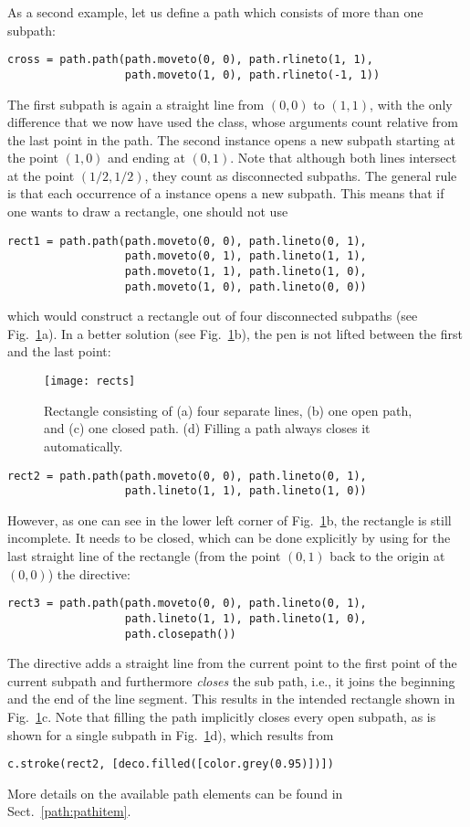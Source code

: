 As a second example, let us define a path which consists of more than 
one subpath:
\begin{verbatim}
cross = path.path(path.moveto(0, 0), path.rlineto(1, 1),
                  path.moveto(1, 0), path.rlineto(-1, 1))
\end{verbatim}
The first subpath is again a straight line from $(0, 0)$ to $(1, 1)$,
with the only difference that we now have used the 
class, whose arguments count relative from the last point in the path.
The second  instance opens a new subpath starting at the
point $(1, 0)$ and ending at $(0, 1)$. Note that although both lines
intersect at the point $(1/2, 1/2)$, they count as disconnected
subpaths.  The general rule is that each occurrence of a 
instance opens a new subpath. This means that if one wants to draw a
rectangle, one should not use
\begin{verbatim}
rect1 = path.path(path.moveto(0, 0), path.lineto(0, 1),
                  path.moveto(0, 1), path.lineto(1, 1),
                  path.moveto(1, 1), path.lineto(1, 0),
                  path.moveto(1, 0), path.lineto(0, 0))
\end{verbatim}
which would construct a rectangle out of four disconnected
subpaths (see Fig.~\ref{fig:rects}a). In a better solution (see
Fig.~\ref{fig:rects}b), the pen is not lifted between the first and
the last point:
%
\begin{figure}
\centerline{\texttt{[image: rects]}}
\caption{Rectangle consisting of (a) four separate lines, (b) one open
  path, and (c) one closed path. (d) Filling a
  path always closes it automatically.}
\label{fig:rects}
\end{figure}
%
\begin{verbatim}
rect2 = path.path(path.moveto(0, 0), path.lineto(0, 1), 
                  path.lineto(1, 1), path.lineto(1, 0))
\end{verbatim}
However, as one can see in the lower left corner of
Fig.~\ref{fig:rects}b, the rectangle is still incomplete.  It needs to
be closed, which can  be done explicitly by using for the last straight
line of the rectangle (from the point $(0, 1)$ back to the origin at $(0, 0)$)
the  directive:
\begin{verbatim}
rect3 = path.path(path.moveto(0, 0), path.lineto(0, 1), 
                  path.lineto(1, 1), path.lineto(1, 0),
                  path.closepath())
\end{verbatim}
The  directive adds a straight line from the current
point to the first point of the current subpath and furthermore
\textit{closes} the sub path, i.e., it joins the beginning and the end
of the line segment. This results in the intended rectangle shown in
Fig.~\ref{fig:rects}c. Note that filling the path implicitly closes
every open subpath, as is shown for a single subpath in
Fig.~\ref{fig:rects}d), which results from
\begin{verbatim}
c.stroke(rect2, [deco.filled([color.grey(0.95)])])
\end{verbatim}
More details on the available path elements can be found in
Sect.~\ref{path:pathitem}.

